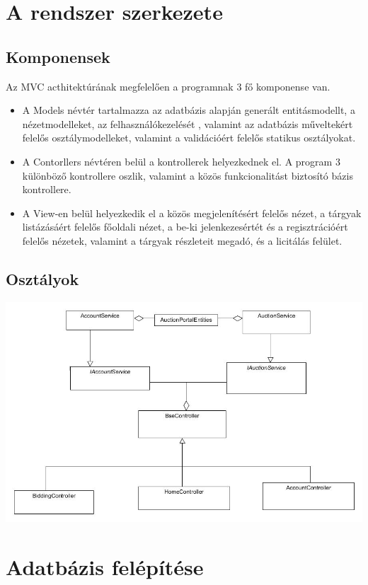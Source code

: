 \documentclass[12pt,a4paper]{article}
\begin{document}
\section{A rendszer szerkezete}
\subsection{Komponensek}
Az MVC acthitektúrának megfelelően a programnak 3 fő komponense van.
\begin{itemize}
\item A Models névtér tartalmazza az adatbázis alapján generált entitásmodellt, a nézetmodelleket, az felhasználókezelését , valamint az adatbázis műveltekért felelős osztálymodelleket, valamint a validációért felelős statikus osztályokat.
\item A Contorllers névtéren belül a kontrollerek helyezkednek el. A program 3 különböző kontrollere oszlik, valamint a közös funkcionalitást biztosító bázis kontrollere.
\item A View-en belül helyezkedik el a közös megjelenítésért felelős nézet, a tárgyak listázásáért felelős főoldali nézet,  a be-ki jelenkezesértét és a regisztrációért felelős nézetek, valamint a tárgyak részleteit megadó, és a licitálás felület.
\end{itemize}
\subsection{Osztályok}
\includegraphics[scale=0.5]{osztaly_szerkezet.jpg}

\section{Adatbázis felépítése}
\end{document}
